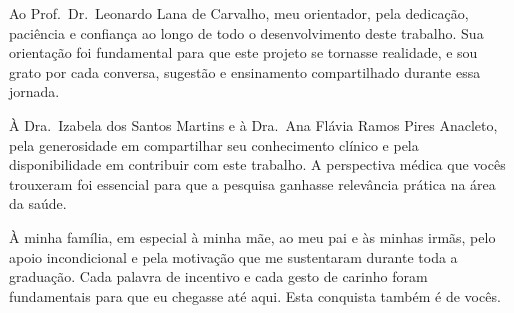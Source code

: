 \begin{agradecimento}
Ao Prof.\ Dr.\ Leonardo Lana de Carvalho, meu orientador, pela dedicação, paciência e
confiança ao longo de todo o desenvolvimento deste trabalho. Sua orientação foi
fundamental para que este projeto se tornasse realidade, e sou grato por cada
conversa, sugestão e ensinamento compartilhado durante essa jornada.

À Dra.\ Izabela dos Santos Martins e à Dra.\ Ana Flávia Ramos Pires Anacleto,
pela generosidade em compartilhar seu conhecimento clínico e pela disponibilidade
em contribuir com este trabalho. A perspectiva médica que vocês trouxeram foi
essencial para que a pesquisa ganhasse relevância prática na área da saúde.

À minha família, em especial à minha mãe, ao meu pai e às minhas irmãs, pelo
apoio incondicional e pela motivação que me sustentaram durante toda a graduação.
Cada palavra de incentivo e cada gesto de carinho foram fundamentais para que eu
chegasse até aqui. Esta conquista também é de vocês.
\end{agradecimento}